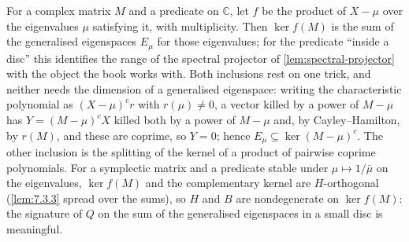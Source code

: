 \begin{lemma}
  \label{lem:eigen-decomp}
  \leanok
  For a complex matrix $M$ and a predicate on $\mathbb{C}$, let $f$ be the
  product of $X - \mu$ over the eigenvalues $\mu$ satisfying it, with
  multiplicity.  Then $\ker f(M)$ is the sum of the generalised eigenspaces
  $E_\mu$ for those eigenvalues; for the predicate ``inside a disc'' this
  identifies the range of the spectral projector of \ref{lem:spectral-projector}
  with the object the book works with.  Both inclusions rest on one trick, and
  neither needs the dimension of a generalised eigenspace: writing the
  characteristic polynomial as $(X-\mu)^c r$ with $r(\mu) \ne 0$, a vector
  killed by a power of $M - \mu$ has $Y = (M-\mu)^c X$ killed both by a power of
  $M - \mu$ and, by Cayley--Hamilton, by $r(M)$, and these are coprime, so
  $Y = 0$; hence $E_\mu \subseteq \ker (M-\mu)^c$.  The other inclusion is the
  splitting of the kernel of a product of pairwise coprime polynomials.  For a
  symplectic matrix and a predicate stable under $\mu \mapsto 1/\bar\mu$ on the
  eigenvalues, $\ker f(M)$ and the complementary kernel are $H$-orthogonal
  (\ref{lem:7.3.3} spread over the sums), so $H$ and $B$ are nondegenerate on
  $\ker f(M)$: the signature of $Q$ on the sum of the generalised eigenspaces in
  a small disc is meaningful.
\end{lemma}

